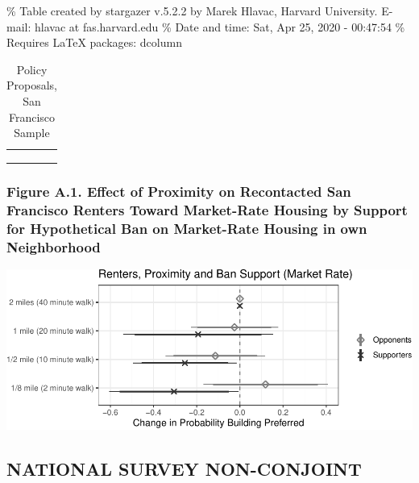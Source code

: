 \documentclass[]{article}
\begin{document}
\% Table created by stargazer v.5.2.2 by Marek Hlavac, Harvard University. E-mail: hlavac at fas.harvard.edu
\% Date and time: Sat, Apr 25, 2020 - 00:47:54
\% Requires LaTeX packages: dcolumn

\begin{table}[H] \centering 
  \caption{Policy Proposals, San Francisco Sample} 
  \label{sf_policies} 
\small 
\begin{tabular}{@{\extracolsep{5pt}} D{.}{.}{-2} } 
\\[-1.8ex]\hline 
\hline \\[-1.8ex] 
 \\ 
\hline \\[-1.8ex] 
\end{tabular} 
\end{table}

\hypertarget{figure-a.1.-effect-of-proximity-on-recontacted-san-francisco-renters-toward-market-rate-housing-by-support-for-hypothetical-ban-on-market-rate-housing-in-own-neighborhood}{%
\subsubsection{Figure A.1. Effect of Proximity on Recontacted San Francisco Renters Toward Market-Rate Housing by Support for Hypothetical Ban on Market-Rate Housing in own Neighborhood}\label{figure-a.1.-effect-of-proximity-on-recontacted-san-francisco-renters-toward-market-rate-housing-by-support-for-hypothetical-ban-on-market-rate-housing-in-own-neighborhood}}

\includegraphics{Zheng-Ruth-Renters-Paper_files/figure-latex/Figure A.1 print-1.pdf}

\hypertarget{national-survey-non-conjoint}{%
\subsection{NATIONAL SURVEY NON-CONJOINT}\label{national-survey-non-conjoint}}
\end{document}
